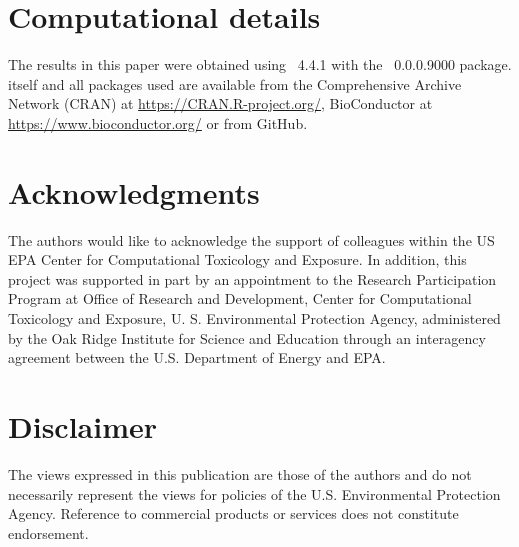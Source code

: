 \documentclass[article]{jss}
\begin{document}

\section*{Computational details}



The results in this paper were obtained using
~4.4.1 with the
~0.0.0.9000 package.  itself
and all packages used are available from the Comprehensive
 Archive Network (CRAN) at
\url{https://CRAN.R-project.org/}, BioConductor at \url{https://www.bioconductor.org/} or from GitHub.


\section*{Acknowledgments}

The authors would like to acknowledge the support of colleagues within the US EPA Center for Computational Toxicology and Exposure. In addition, this project was supported in part by an appointment to the Research Participation Program at Office of Research and Development, Center for Computational Toxicology and Exposure, U. S. Environmental Protection Agency, administered by the Oak Ridge Institute for Science and Education through an interagency agreement between the U.S. Department of Energy and EPA.

\section*{Disclaimer}


The views expressed in this publication are those of the authors and do not necessarily represent the views for policies of the U.S. Environmental Protection Agency. Reference to commercial products or services does not constitute endorsement.








\newpage

\begin{appendix}


\end{appendix}

\end{document}
